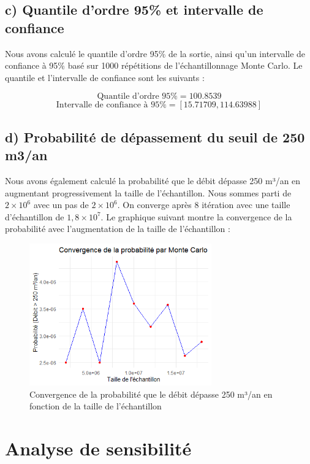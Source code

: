\documentclass[a4paper,12pt]{article}
\begin{document}
\subsection{c) Quantile d'ordre 95\% et intervalle de confiance}
Nous avons calculé le quantile d'ordre 95\% de la sortie, ainsi qu'un intervalle de confiance à 95\% basé sur 1000 répétitions de l'échantillonnage Monte Carlo. Le quantile et l'intervalle de confiance sont les suivants :

\begin{equation}
\text{Quantile d'ordre 95\%} = 100.8539 
\end{equation}
\begin{equation}
\text{Intervalle de confiance à 95\%} = [15.71709, 114.63988]
\end{equation}

\subsection{d) Probabilité de dépassement du seuil de 250 m3/an}
Nous avons également calculé la probabilité que le débit dépasse 250 m³/an en augmentant progressivement la taille de l'échantillon. Nous sommes parti de $2\times10^6$ avec un pas de $2\times10^6$. On converge après 8 itération avec une taille d'échantillon de $1,8\times10^7$.
Le graphique suivant montre la convergence de la probabilité avec l'augmentation de la taille de l'échantillon :

\begin{figure}[h!]
    \centering
    \includegraphics[width=0.7\textwidth]{conv.png}
    \caption{Convergence de la probabilité que le débit dépasse 250 m³/an en fonction de la taille de l'échantillon}
\end{figure}

\section{Analyse de sensibilité}
\end{document}
